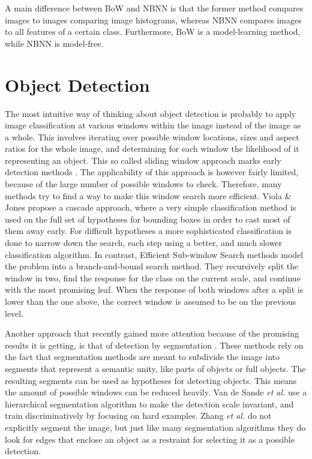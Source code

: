 A main difference between BoW and NBNN is that the former method compares images to images comparing image histograms, whereas NBNN compares images to all features of a certain class. Furthermore, BoW is a model-learning method, while NBNN is model-free.


\section{Object Detection} %
\label{sec:object_detection}

The most intuitive way of thinking about object detection is probably to apply image classification at various windows within the image instead of the image as a whole. This involves iterating over possible window locations, sizes and aspect ratios for the whole image, and determining for each window the likelihood of it representing an object. This so called sliding window approach marks early detection methods \cite{viola2004robust}. The applicability of this approach is however fairly limited, because of the large number of possible windows to check. Therefore, many methods try to find a way to make this window search more efficient. Viola \& Jones \cite{viola2004robust} propose a cascade approach, where a very simple classification method is used on the full set of hypotheses for bounding boxes in order to cast most of them away early. For difficult hypotheses a more sophisticated classification is done to narrow down the search, each step using a better, and much slower classification algorithm. In contrast, Efficient Sub-window Search methods \cite{behmo2010towards, lampert2008beyond, pedersoli2011coarse, yeh2009fast} model the problem into a branch-and-bound search method. They recursively split the window in two, find the response for the class on the current scale, and continue with the most promising leaf. When the response of both windows after a split is lower than the one above, the correct window is assumed to be on the previous level.

Another approach that recently gained more attention because of the promising results it is getting, is that of detection by segmentation \cite{van2011segmentation, zhang2010free}. These methods rely on the fact that segmentation methods are meant to subdivide the image into segments that represent a semantic unity, like parts of objects or full objects. The resulting segments can be used as hypotheses for detecting objects. This means the amount of possible windows can be reduced heavily. Van de Sande \emph{et al.} \cite{van2011segmentation} use a hierarchical segmentation algorithm to make the detection scale invariant, and train discriminatively by focusing on hard examples. Zhang \emph{et al.} \cite{zhang2010free} do not explicitly segment the image, but just like many segmentation algorithms they do look for edges that enclose an object as a restraint for selecting it as a possible detection.

